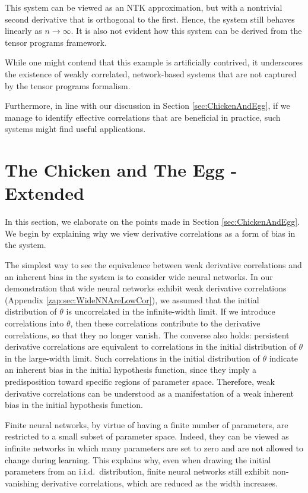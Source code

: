 \documentclass{article} %
\begin{document}
This system can be viewed as an NTK approximation, but with a nontrivial second derivative that is orthogonal to the first. Hence, the system still behaves linearly as \(n\rightarrow\infty\). It is also not evident how this system can be derived from the tensor programs framework.

While one might contend that this example is artificially contrived, it underscores the existence of weakly correlated, network-based systems that are not captured by the tensor programs formalism.

Furthermore, in line with our discussion in Section \ref{sec:ChickenAndEgg}, if we manage to identify effective correlations that are beneficial in practice, such systems might find \textcolor{black}{useful} applications.

\section{The Chicken and The Egg - Extended} 
\label{zap:sec:Chicken}

In this section, we elaborate on the points made in Section \ref{sec:ChickenAndEgg}. We begin by explaining why we view derivative correlations as a form of bias in the system.

The simplest way to see the equivalence between weak derivative correlations and an inherent bias in the system is to consider wide neural networks. In our demonstration that wide neural networks exhibit weak derivative correlations (Appendix \ref{zap:sec:WideNNAreLowCor}), we assumed that the initial distribution of \(\theta\) is uncorrelated in the infinite-width limit. If we introduce correlations into \(\theta\), then these correlations contribute to the derivative correlations, \textcolor{black}{so that they no longer vanish}. The converse also holds: persistent derivative correlations are equivalent to correlations in the initial distribution of \(\theta\) in the large-width limit. Such correlations in the initial distribution of \(\theta\) indicate an inherent bias in the initial hypothesis function, since they imply a predisposition toward specific regions of parameter space. \textcolor{black}{Therefore}, weak derivative correlations can be understood as a manifestation of a weak inherent bias in the initial hypothesis function.

Finite neural networks, by virtue of having a finite number of parameters, are restricted to a small subset of parameter space. Indeed, they can be viewed as infinite networks in which many parameters are set to zero \textcolor{black}{and are not allowed to change during learning}. This explains why, even when drawing the initial parameters from an i.i.d.\ distribution, finite neural networks still exhibit non-vanishing derivative correlations, which are reduced as the width increases.
\end{document}
